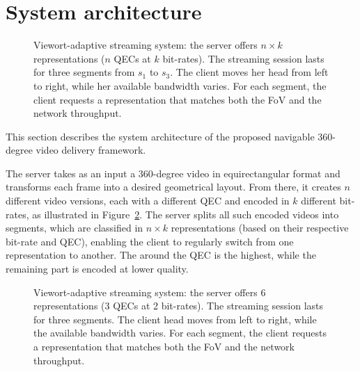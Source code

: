 \section{System architecture}

\begin{figure}
   \centering
   
   \caption{Viewort-adaptive streaming system: the server offers $n\times k$ representations ($n$ \acp{QEC} at $k$ bit-rates). The streaming session lasts for three segments from $s_1$ to $s_3$. The client moves her head from left to right, while her available bandwidth varies. For each segment, the client requests a representation that matches both the \ac{FoV} and the network throughput.}
   \label{fig:newdelivery}
\end{figure}

This section describes the system architecture of the proposed
navigable 360-degree video delivery framework.

The server takes as an input a 360-degree video in
equirectangular format and transforms each frame into a desired
geometrical layout. From there, it creates $n$ different video
versions, each with a different \ac{QEC} and encoded in $k$ different
bit-rates, as illustrated in Figure~\ref{fig:newdelivery}. The server
splits all such encoded videos into segments, which are classified in
$n\!\times\!k$ representations (based on their respective bit-rate and
\ac{QEC}), enabling the client to regularly switch from one
representation to another. The  around the
\ac{QEC} is the highest, while the remaining part is encoded at lower
quality.

\begin{figure}
   \centering
   
   \caption{Viewort-adaptive streaming system: the server offers \num{6} representations (\num{3} \acp{QEC} at \num{2} bit-rates). The streaming session lasts for three segments. The client head moves from left to right, while the available bandwidth varies. For each segment, the client requests a representation that matches both the \ac{FoV} and the network throughput.}
   \label{fig:newdelivery}
\end{figure}

